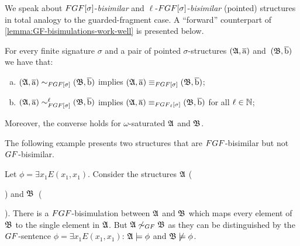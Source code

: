 We speak about $\FGF[\sigma]$-\emph{bisimilar} and $\ell$-$\FGF[\sigma]$-\emph{bisimilar} (pointed) structures in total analogy to the guarded-fragment case.
A ``forward'' counterpart of \cref{lemma:GF-bisimulations-work-well} is presented below.
\begin{lemma}\label{lemma:FGF-bisimulations-work-well}
For every finite signature $\sigma$ and a pair of pointed $\sigma$-structures $({\mathfrak{A}}, \overline{\mathrm{a}})$ and~$({\mathfrak{B}}, \overline{\mathrm{b}})$ we have that:
\begin{enumerate}[(a)]
\item $(\str{A}, \elemtuplea) \bisimto_{\FGF[\sigma]} (\str{B}, \elemtupleb)$ implies $(\str{A}, \elemtuplea) \equiv_{\FGF[\sigma]} (\str{B}, \elemtupleb)$;
\item $(\str{A}, \elemtuplea) \bisimto_{\FGF[\sigma]}^{\ell} (\str{B}, \elemtupleb)$ implies $(\str{A}, \elemtuplea) \equiv_{\FGF_\ell[\sigma]} (\str{B}, \elemtupleb)$ for all $\ell \in {\mathbb{N}}$;
\end{enumerate}
Moreover, the converse holds for $\omega$-saturated ${\mathfrak{A}}$ and ${\mathfrak{B}}$.
\end{lemma}


The following example presents two structures that are $\FGF$-bisimilar but not $\GF$-bisimilar.
\begin{example} Let $\phi = \exists{x_{1}} E(x_{1}, x_{1})$. Consider the structures
  ${\mathfrak{A}}$ () and
  ${\mathfrak{B}}$~().
  There is a $\FGF$-bisimulation between ${\mathfrak{A}}$ and ${\mathfrak{B}}$ which maps every element of ${\mathfrak{B}}$ to the single element in ${\mathfrak{A}}$.
  But $\str{A} \not\bisimto_{\GF} \str{B}$ as they can be distinguished by the $\GF$-sentence $\phi = \exists{x_{1}} E(x_{1}, x_{1})$: ${\mathfrak{A}} \models \phi$ and ${\mathfrak{B}} \not\models \phi$.
\end{example}
